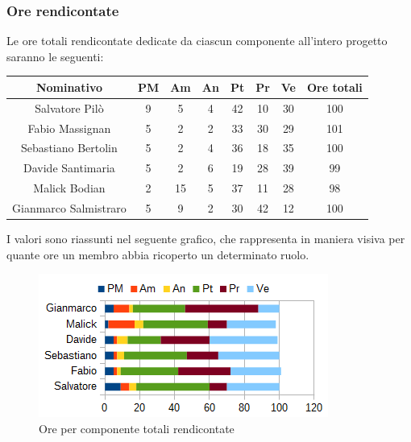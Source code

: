		\subsubsection{Ore rendicontate}
		Le ore totali rendicontate dedicate da ciascun componente all'intero progetto saranno le seguenti: \\
		\begin{table}[H]
		\centering
		\begin{tabular}{|c|c|c|c|c|c|c|c|}
			\hline
			\textbf{Nominativo}		& \textbf{PM}	& \textbf{Am}	& \textbf{An}	& \textbf{Pt}	& \textbf{Pr}	& \textbf{Ve}	& \textbf{Ore totali}     \\
			\hline
			Salvatore Pilò			& 9		& 5		& 4		& 42	& 10	& 30	& 100 \\
			Fabio Massignan			& 5		& 2		& 2		& 33	& 30	& 29	& 101 \\
			Sebastiano Bertolin		& 5		& 2		& 4		& 36	& 18	& 35	& 100 \\
			Davide Santimaria		& 5		& 2		& 6		& 19	& 28	& 39	& 99 \\
			Malick Bodian			& 2		& 15	& 5		& 37	& 11	& 28	& 98 \\
			Gianmarco Salmistraro	& 5		& 9		& 2		& 30	& 42	& 12	& 100 \\
			\hline
		\end{tabular}
		\end{table}
		I valori sono riassunti nel seguente grafico, che rappresenta in maniera visiva per quante ore un membro abbia ricoperto un determinato ruolo. \\
		\begin{figure}[H]
			\centering
			\includegraphics[width=1\linewidth]{immagini/grafici/orario_rendicontato-barra.png}
			\caption{Ore per componente totali rendicontate}
		\end{figure}